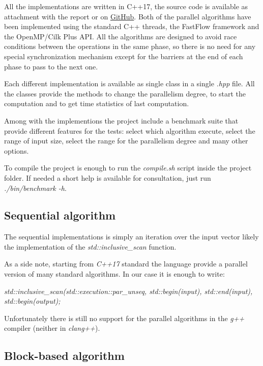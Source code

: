 \documentclass{article}
\begin{document}
All the implementations are written in C++17, the source code is available as attachment with the report or on \href{https://github.com/GaspareG/ParallelPrefix}{GitHub}.
Both of the parallel algorithms have been implemented using the standard C++ threads, the FastFlow framework and the OpenMP/Cilk Plus API. All the algorithms are designed to avoid race conditions between the operations in the same phase, so there is no need for any special synchronization mechanism except for the barriers at the end of each phase to pass to the next one.

Each different implementation is available as single class in a single \textit{.hpp} file. All the classes provide the methods to change the parallelism degree, to start the computation and to get time statistics of last computation.

Among with the implementions the project include a benchmark suite that provide different features for the tests: select which algorithm execute, select the range of input size, select the range for the parallelism degree and many other options.

To compile the project is enough to run the \textit{compile.sh} script inside the project folder.
If needed a short help is available for consultation, just run \textit{./bin/benchmark -h}.

\subsection{Sequential algorithm}

The sequential implementations is simply an iteration over the input vector likely the implementation of the \textit{std::inclusive\_scan} function.

\smallskip

As a side note, starting from \textit{C++17} standard the language provide a parallel version of many standard algorithms. In our case it is enough to write:

\smallskip

\textit{std::inclusive\_scan(std::execution::par\_unseq, std::begin(input), std::end(input), std::begin(output);}

\smallskip

Unfortunately there is still no support for the parallel algorithms in the \textit{g++} compiler (neither in \textit{clang++}).

\subsection{Block-based algorithm}
\end{document}

